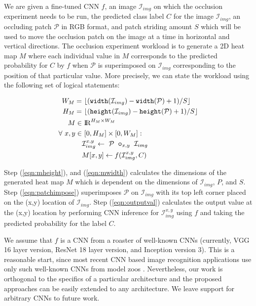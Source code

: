 We are given a fine-tuned CNN $f$, an image $\mathcal{I}_{img}$ on which the occlusion experiment needs to be run, the predicted class label $C$ for the image $\mathcal{I}_{img}$, an occluding patch $\mathcal{P}$ in RGB format, and patch striding amount $S$ which will be used to move the occlusion patch on the image at a time in horizontal and vertical directions. The occlusion experiment workload is to generate a 2D heat map $M$ where each individual value in $M$ corresponds to the predicted probability for $C$ by $f$ when $\mathcal{P}$ is superimposed on $\mathcal{I}_{img}$ corresponding to the position of that particular value. More precisely, we can state the workload using the following set of logical statements:


\begin{align}
\label{eqn:mheight}
W_M =&~ \lfloor(\texttt{width}(\mathcal{I}_{img}) - \texttt{width}(\mathcal{P}) + 1)/S\rfloor\\
\label{eqn:mwidth}
H_M =&~ \lfloor(\texttt{height}(\mathcal{I}_{img}) - \texttt{height}(\mathcal{P}) + 1)/S\rfloor\\
M \in&~ \mathcal{\rm I\!R}^{H_M \times W_M}\\
\forall~ x,y \in&~ [0, H_M] \times [0, W_M]:\\
\label{eqn:patchimpose}
& \mathcal{I}_{img}^{x,y} \leftarrow ~\mathcal{P} ~ \bm\circ_{x,y} ~ \mathcal{I}_{img}\\
\label{eqn:outputval}
& M[x,y] \leftarrow f(\mathcal{I}_{img}^{x,y},C)
\end{align}

Step (\ref{eqn:mheight}), and (\ref{eqn:mwidth}) calculates the dimensions of the generated heat map $M$ which is dependent on the dimensions of $\mathcal{I}_{img}$, $P$, and $S$.
Step (\ref{eqn:patchimpose}) superimposes $\mathcal{P}$ on $\mathcal{I}_{img}$ with its top left corner placed on the (x,y) location of $\mathcal{I}_{img}$.
Step (\ref{eqn:outputval}) calculates the output value at the (x,y) location by performing CNN inference for $\mathcal{I}_{img}^{x,y}$ using $f$ and taking the predicted probability for the label $C$.

We assume that $f$ is a CNN from a roaster of well-known CNNs (currently, VGG 16 layer version, ResNet 18 layer version, and Inception version 3).
This is a reasonable start, since most recent CNN based image recognition applications use only such well-known CNNs from model zoos \cite{caffemodelzoo, tfmodelzoo}.
Nevertheless, our work is orthogonal to the specifics of a particular architecture and the proposed approaches can be easily extended to any architecture.
We leave support for arbitrary CNNs to future work.

